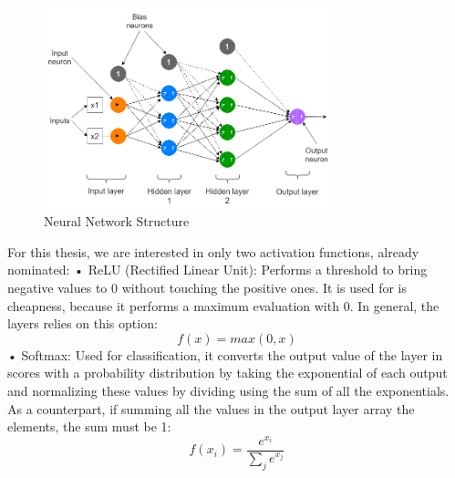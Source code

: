 \begin{center}
    \begin{figure}[!h]
        \centering
        \includegraphics[width=0.75\textwidth]{images/2.05 Neural Network Structure.png}
        \caption{Neural Network Structure}
    \end{figure}
\end{center}
For this thesis, we are interested in only two activation functions, already nominated:\newline
• ReLU (Rectified Linear Unit): Performs a threshold to bring negative values to 0 without touching the positive ones. It is used for is cheapness, because it performs a maximum evaluation with 0. In general, the layers relies on this option:\newline
\begin{equation}
    f(x)=max(0,x)
\end{equation}
• Softmax: Used for classification, it converts the output value of the layer in scores with a probability distribution by taking the exponential of each output and normalizing these values by dividing using the sum of all the exponentials. As a counterpart, if summing all the values in the output layer array the elements, the sum must be 1:\newline
\begin{equation}
    f(x_i)=\frac{e^{x_i}}{\sum_je^{x_j}}
\end{equation}
